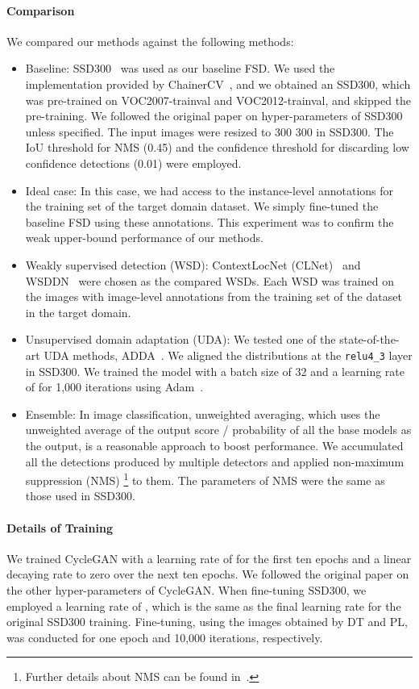 \documentclass[10pt,twocolumn,letterpaper]{article}
\begin{document}
\paragraph{Comparison}
We compared our methods against the following methods:
\begin{itemize}[wide=0pt]
\setlength{\itemsep}{0cm}
	\item Baseline: SSD300~\cite{liu2016ssd} was used as our baseline FSD.
We used the implementation provided by ChainerCV~\cite{ChainerCV2017}, and
we obtained an SSD300, which was pre-trained on VOC2007-trainval and VOC2012-trainval, and skipped the pre-training.
We followed the original paper on hyper-parameters of SSD300 unless specified.
The input images were resized to 300  300 in SSD300.
The IoU threshold for NMS (0.45) and the confidence threshold for discarding low confidence detections (0.01) were employed.
	\item Ideal case: 
In this case, we had access to the instance-level annotations for the training set of the target domain dataset.
We simply fine-tuned the baseline FSD using these annotations.
This experiment was to confirm the weak upper-bound performance of our methods.
	\item Weakly supervised detection (WSD): ContextLocNet (CLNet)~\cite{kantorov2016contextlocnet} and WSDDN~\cite{bilen2016weakly} were chosen as the compared WSDs. Each WSD was trained on the images with image-level annotations from the training set of the dataset in the target domain.
	\item Unsupervised domain adaptation (UDA): We tested one of the state-of-the-art UDA methods, ADDA~\cite{tzeng2017adversarial}.
We aligned the distributions at the \texttt{relu4\_3} layer in SSD300. We trained the model with a batch size of 32 and a learning rate of  for 1,000 iterations using Adam~\cite{kingma2015adam}.
	\item Ensemble: In image classification, unweighted averaging, which uses the unweighted average of the output score / probability of all the base models as the output, is a reasonable approach to boost performance.
We accumulated all the detections produced by multiple detectors and applied non-maximum suppression (NMS) \footnote{Further details about NMS can be found in~\cite{felzenszwalb2010object}.} to them.
The parameters of NMS were the same as those used in SSD300.
\end{itemize}

\paragraph{Details of Training}
We trained CycleGAN with a learning rate of  for the first ten epochs and a linear decaying rate to zero over the next ten epochs.
We followed the original paper on the other hyper-parameters of CycleGAN.
When fine-tuning SSD300, we employed a learning rate of , which is the same as the final learning rate for the original SSD300 training.
Fine-tuning, using the images obtained by DT and PL, was conducted for one epoch and 10,000 iterations, respectively.
\end{document}
